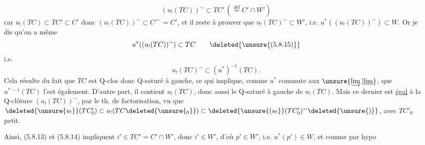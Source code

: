 
\deleted{\[
 u^{*}(TC')\subset W
\]}
\[
 (u_{!}(TC))^{\sim}\subset TC'\,(\overset{\mathrm{déf}}=C'\cap W')\tag*{(5.8.14)}
\]
car $u_{!}(TC)\subset TC'\subset C'$ donc $(u_{!}(TC))^{\sim}\subset {C'}^{\sim}=C'$,
et il reste à prouver que $u_{!}(TC)^{\sim}\subset W'$,
i.e. $u^{*}((u_{!}(TC))^{\sim})\subset W$. Or je dis qu'on
a même
\[
 u^{*}((u_{!}(TC))^{\sim})\subset TC \tag*{\deleted{\unsure{(5.8.15)}}}
\]
i.e.
\[
 u_{!}(TC)^{\sim}\subset (u^{*})^{-1}(TC).\tag*{(5.8.15)}
\]
Cela résulte du fait que $TC$ est Q-clos
donc Q-saturé à gauche, ce qui implique,
comme $u^{*}$ commute aux  $\unsure{\varinjlim|\underline{\lim}}$, que
$u^{*\, -1}(TC)$ l'est également. D'autre part,
il contient $u_{!}(TC)$, donc aussi le
Q-saturé à gauche de $u_{!}(TC)$. Mais
ce dernier est \uline{égal} à la Q-clôture
$(u_{!}(TC))^{\sim}$, par le th. de factorisation,
vu que $\deleted{\unsure{u_{!}}}(TC'_{0})\subset u_{!}(TC\deleted{\unsure{{}_{0}}})\subset\deleted{\unsure{(u_{!}}}(TC'_{0})^{\sim}\deleted{\unsure{)}}$,
avec  $TC'_{0}$ petit.

Ainsi, (5.8.13) et (5.8.14) impliquent
$i'\in TC'=C'\cap W'$, donc $i'\in W'$, d'où $p'\in W'$,
i.e.  $u^{*}(p')\in W$, et comme par hypo

